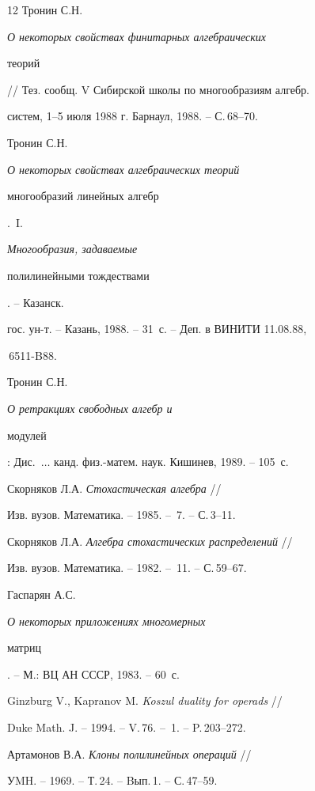 \begin{thebibliography}{12}
 Тронин С.Н. {\em О некоторых свойствах финитарных алгебраических


теорий} // Тез. сообщ. V Сибирской школы по многообразиям алгебр.


систем, 1--5 июля 1988 г. Барнаул, 1988. -- С.\,68--70.





 Тронин С.Н. {\em О некоторых свойствах алгебраических теорий


многообразий линейных ал\-гебр}.~I. {\em Многообразия, задаваемые


полилинейными тождествами}. -- Казанск.


гос. ун-т. -- Казань, 1988. -- 31~с. -- Деп. в ВИНИТИ 11.08.88,


\No\,6511-B88.





 Тронин С.Н. {\em О ретракциях свободных алгебр и


модулей}: Дис.~$\dotsc$ канд. физ.-матем. наук. Кишинев, 1989. -- 105~с.





 Скорняков Л.А. {\em Стохастическая алгебра} //


Изв. вузов. Математика. -- 1985. -- \No\,7. -- С.\,3--11.





 Скорняков Л.А. {\em Алгебра стохастических распределений} //


Изв. вузов. Математика. -- 1982. -- \No\,11. -- С.\,59--67.





 Гаспарян А.С. {\em О некоторых приложениях многомерных


матриц}. -- М.: ВЦ АН СССР, 1983. -- 60~с.





 Ginzburg V., Kapranov M. {\em Koszul duality for operads} //


Duke Math. J. -- 1994. -- V.\,76. -- \No\,1. -- P.\,203--272.





 Артамонов В.А. {\em Клоны полилинейных операций} //


УMH. -- 1969. -- Т.\,24. -- Bып.\,1. -- С.\,47--59.






\end{thebibliography}
